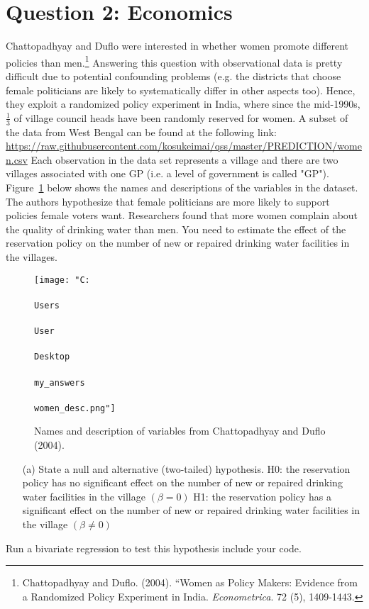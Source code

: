 \documentclass[12pt,letterpaper]{article}
\begin{document}
\section*{Question 2: Economics}
Chattopadhyay and Duflo were interested in whether women promote different policies than men.\footnote{Chattopadhyay and Duflo. (2004). ``Women as Policy Makers: Evidence from a Randomized Policy Experiment in India. \textit{Econometrica}. 72 (5), 1409-1443.} Answering this question with observational data is pretty difficult due to potential confounding problems (e.g. the districts that choose female politicians are likely to systematically differ in other aspects too). Hence, they exploit a randomized policy experiment in India, where since the mid-1990s, $\frac{1}{3}$ of village council heads have been randomly reserved for women. A subset of the data from West Bengal can be found at the following link: \url{https://raw.githubusercontent.com/kosukeimai/qss/master/PREDICTION/women.csv}
\noindent Each observation in the data set represents a village and there are two villages associated with one GP (i.e. a level of government is called "GP"). Figure~\ref{fig:women_desc} below shows the names and descriptions of the variables in the dataset. The authors hypothesize that female politicians are more likely to support policies female voters want. Researchers found that more women complain about the quality of drinking water than men. You need to estimate the effect of the reservation policy on the number of new or repaired drinking water facilities in the villages.
\vspace{.5cm}
\begin{figure}[h!]
	\caption{\footnotesize{Names and description of variables from Chattopadhyay and Duflo (2004).}}
	\vspace{.5cm}
	\centering
	\label{fig:women_desc}
	\texttt{[image: "C:\\\\Users\\\\User\\\\Desktop\\\\my\_answers\\\\women\_desc.png"]}	
\end{figure}		
\newpage
\begin{enumerate}
	\item [(a)] State a null and alternative (two-tailed) hypothesis.
	\newline 
	H0: the reservation policy has no significant effect on the number of new or repaired drinking water facilities in the village \((\beta = 0)\)
	\newline
	H1: the reservation policy has a significant effect on the number of new or repaired drinking water facilities in the village \((\beta \neq 0)\)
	\vspace{0.6cm}
\end{enumerate}
	Run a bivariate regression to test this hypothesis include your code.
	\newline
\end{document}
